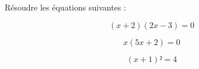 \documentclass{automatisme}
\begin{document}
\begin{frame}
	Résoudre les équations suivantes :

	\setlength{\columnseprule}{1pt}
	\begin{multicols}{3}
		$$(x + 2)(2x - 3) = 0$$
		\vspace*{5em}

		\columnbreak

		$$x(5x + 2) = 0$$
		\vspace*{5em}

		\columnbreak

		$$(x + 1)² = 4$$
		\vspace*{5em}
	\end{multicols}
\end{frame}
\end{document}
